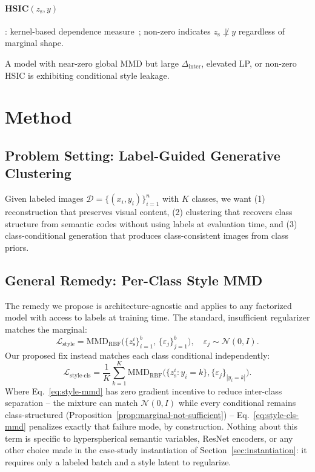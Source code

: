 \documentclass[10pt,letterpaper]{article}
\newcommand{\zs}{z_{\mathrm{s}}}
\newcommand{\MMD}{\mathrm{MMD}}
\begin{document}
\paragraph{HSIC$(\zs,y)$}: kernel-based dependence
measure~\citep{gretton2005measuring}; non-zero indicates $\zs\not\perp y$
regardless of marginal shape.

A model with near-zero global MMD but large $\Delta_{\mathrm{inter}}$,
elevated LP, or non-zero HSIC is exhibiting conditional style leakage.

\section{Method}
\label{sec:method}

\subsection{Problem Setting: Label-Guided Generative Clustering}

Given labeled images $\mathcal{D}=\{(x_i,y_i)\}_{i=1}^n$ with $K$ classes,
we want (1) reconstruction that preserves visual content, (2) clustering
that recovers class structure from semantic codes without using labels at
evaluation time, and (3) class-conditional generation that produces
class-consistent images from class priors.

\subsection{General Remedy: Per-Class Style MMD}
\label{sec:general-remedy}

The remedy we propose is architecture-agnostic and applies to any
factorized model with access to labels at training time. The standard,
insufficient regularizer matches the marginal:
\begin{equation}
  \mathcal{L}_{\mathrm{style}} = \MMD_{\mathrm{RBF}}\!\bigl(\{\zs^i\}_{i=1}^b,\,\{\varepsilon_j\}_{j=1}^b\bigr),
  \quad \varepsilon_j\sim\mathcal N(0,I).
  \label{eq:style-mmd}
\end{equation}
Our proposed fix instead matches each class conditional independently:
\begin{equation}
  \mathcal{L}_{\mathrm{style\text{-}cls}} = \frac{1}{K}\sum_{k=1}^{K}
    \MMD_{\mathrm{RBF}}\!\bigl(\{\zs^i:y_i{=}k\},\{\varepsilon_j\}_{|y_i=k|}\bigr).
  \label{eq:style-cls-mmd}
\end{equation}
Where Eq.~\ref{eq:style-mmd} has zero gradient incentive to reduce
inter-class separation -- the mixture can match $\mathcal N(0,I)$ while
every conditional remains class-structured
(Proposition~\ref{prop:marginal-not-sufficient}) -- Eq.~\ref{eq:style-cls-mmd}
penalizes exactly that failure mode, by construction. Nothing about this
term is specific to hyperspherical semantic variables, ResNet encoders, or
any other choice made in the case-study instantiation of
Section~\ref{sec:instantiation}: it requires only a labeled batch and a
style latent to regularize.
\end{document}
